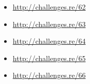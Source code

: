 \sectionold{\Exercises}

\begin{itemize}
	\item \url{http://challenges.re/62}
	\item \url{http://challenges.re/63}
	\item \url{http://challenges.re/64}
	\item \url{http://challenges.re/65}
	\item \url{http://challenges.re/66}
\end{itemize}

